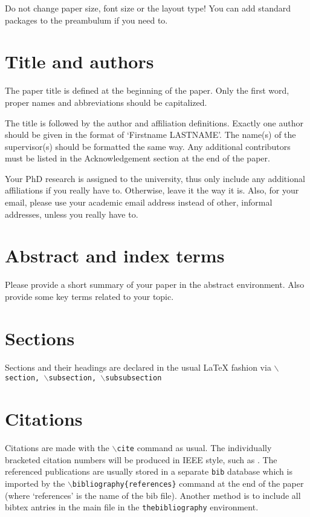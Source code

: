 \documentclass[10pt, conference,a4paper]{ITKproc}
\begin{document}
Do not change paper size, font size or the layout type! You can add standard packages to the preambulum if you need to.


\section{Title and authors}
The paper title is defined at the beginning of the paper. Only the first word, proper names and abbreviations should be capitalized.

The title is followed by the author and affiliation definitions. Exactly one author should be given in the format of `Firstname LASTNAME'. The name(s) of the supervisor(s) should be formatted the same way. Any additional contributors must be listed in the Acknowledgement section at the end of the paper.

Your PhD research is assigned to the university, thus only include any additional affiliations if you really have to. Otherwise, leave it the way it is. Also, for your email, please use your academic email address instead of other, informal addresses, unless you really have to. 

\section{Abstract and index terms}
Please provide a short summary of your paper in the abstract environment. Also provide some key terms related to your topic.

\section{Sections}
Sections and their headings are declared in the usual {\LaTeX}
fashion via \texttt{$\backslash$section, $\backslash$subsection, $\backslash$subsubsection}



\section{Citations}
Citations are made with the  \texttt{$\backslash$cite} command as usual.
The individually bracketed citation numbers will be produced in IEEE style, such as \cite{lamport94}. The referenced publications are usually stored in a separate \texttt{bib} database which is imported by the \texttt{$\backslash$bibliography\{references\}} command at the end of the paper (where `references' is the name of the bib file). Another method is to include all bibtex antries in the main file in the \texttt{thebibliography} environment.
\end{document}

